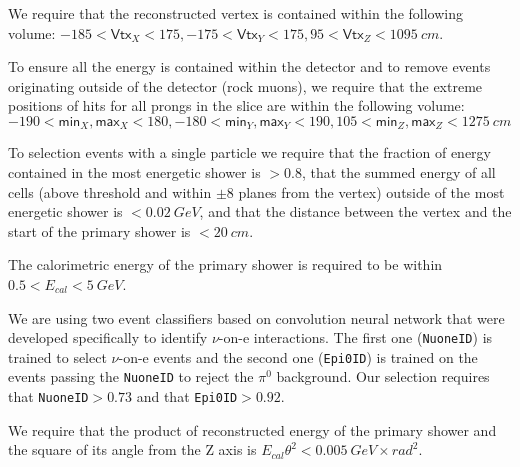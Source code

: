 
We require that the reconstructed vertex is contained within the following volume: $-185<\textsf{Vtx}_X<175,-175<\textsf{Vtx}_Y<175, 95<\textsf{Vtx}_Z<1095\ \unit{cm}$.

To ensure all the energy is contained within the detector and to remove events originating outside of the detector (rock muons), we require that the extreme positions of hits for all prongs in the slice are within the following volume: $-190<\textsf{min}_X, \textsf{max}_X<180, -180<\textsf{min}_Y, \textsf{max}_Y<190, 105<\textsf{min}_Z, \textsf{max}_Z<1275\ \unit{cm}$

To selection events with a single particle we require that the fraction of energy contained in the most energetic shower is $>0.8$, that the summed energy of all cells (above threshold and within $\pm8$ planes from the vertex) outside of the most energetic shower is $<0.02\ \unit{GeV}$, and that the distance between the vertex and the start of the primary shower is $<20\ \unit{cm}$.

The calorimetric energy of the primary shower is required to be within $0.5<E_{cal}<5\ \unit{GeV}$.

We are using two event classifiers based on convolution neural network that were developed specifically to identify $\nu$-on-e interactions. The first one (\texttt{NuoneID}) is trained to select $\nu$-on-e events and the second one (\texttt{Epi0ID}) is trained on the events passing the \texttt{NuoneID} to reject the $\pi^0$ background. Our selection requires that \texttt{NuoneID}$>0.73$ and that \texttt{Epi0ID}$>0.92$.

We require that the product of reconstructed energy of the primary shower and the square of its angle from the Z axis is $E_{cal}\theta^2<0.005\ \unit{GeV\times rad^2}$.


